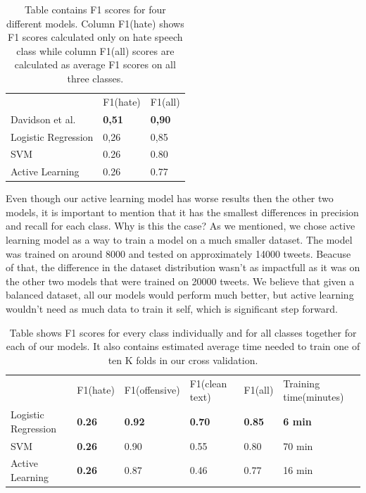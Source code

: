 \documentclass[10pt, a4paper]{article}
\begin{document}
\begin{table}[!ht]
	\centering
	\caption{Table contains F1 scores for four different models. Column F1(hate) shows F1 scores calculated only on hate speech class while column F1(all)  scores are calculated as average F1 scores on all three classes.}
	\label{tbl:scoreAll}
	\begin{tabular}{|l|l|l|}
		& F1(hate)      & F1(all)       \\
		Davidson et al.     & \textbf{0,51} & \textbf{0,90} \\
		Logistic Regression & 0,26          & 0,85          \\
		SVM                 & 0.26          & 0.80          \\
		Active Learning     & 0.26          & 0.77         
	\end{tabular}
\end{table}
Even though our active learning model has worse results then the other two models, it is important to mention that it has the smallest differences in precision and recall for each class. Why is this the case? As we mentioned, we chose active learning model as a way to train a model on a much smaller dataset. The model was trained on around 8000 and tested on approximately 14000 tweets. Beacuse of that, the difference in the dataset distribution wasn't as impactfull as it was on the other two models that were trained on 20000 tweets. We believe that given a balanced dataset, all our models would perform much better, but active learning wouldn't need as much data to train it self, which is significant step forward.
\begin{table}[!t]
	\centering
	\caption{Table shows F1 scores for every class individually and for all classes together for each of our models. It also contains estimated average time needed to train one of ten K folds in our cross validation.}
	\label{tbl:scoreOur}
	\begin{tabular}{|l|l|l|l|l|l|}
		& F1(hate)      & F1(offensive) & F1(clean text) & F1(all)       & Training time(minutes) \\
		Logistic Regression & \textbf{0.26} & \textbf{0.92} & \textbf{0.70}  & \textbf{0.85} & \textbf{6 min}         \\
		SVM                 & \textbf{0.26} & 0.90          & 0.55           & 0.80          & 70 min                 \\
		Active Learning     & \textbf{0.26} & 0.87          & 0.46           & 0.77          & 16 min                
	\end{tabular}
\end{table}
\end{document}
